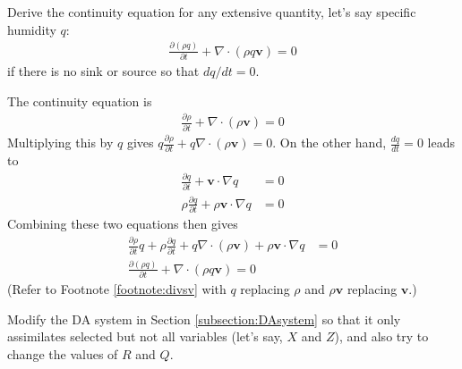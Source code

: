 \begin{Exercise}
Derive the continuity equation for any extensive quantity, let's say specific humidity $q$:
\begin{align*}
\frac{\partial (\rho q)}{\partial t} + \nabla \cdot(\rho q \textbf{v}) = 0
\end{align*}
if there is no sink or source so that $dq/dt=0$.
\end{Exercise}
\begin{Answer}
The continuity equation is
\begin{align*}
\frac{\partial \rho}{\partial t} + \nabla \cdot(\rho\textbf{v}) = 0 
\end{align*}
Multiplying this by $q$ gives $q\frac{\partial \rho}{\partial t} + q\nabla \cdot(\rho\textbf{v}) = 0$. On the other hand, $\frac{dq}{dt} = 0$ leads to
\begin{align*}
\frac{\partial q}{\partial t} + \textbf{v}\cdot \nabla{q} &= 0 \\
\rho\frac{\partial q}{\partial t} + \rho\textbf{v}\cdot \nabla{q} &= 0
\end{align*}
Combining these two equations then gives
\begin{align*}
\frac{\partial \rho}{\partial t}q + \rho\frac{\partial q}{\partial t} + q\nabla \cdot(\rho\textbf{v}) + \rho\textbf{v}\cdot \nabla{q} &= 0 \\
\frac{\partial (\rho q)}{\partial t} + \nabla \cdot(\rho q \textbf{v}) = 0
\end{align*}
(Refer to Footnote \ref{footnote:divsv} with $q$ replacing $\rho$ and $\rho \textbf{v}$ replacing $\textbf{v}$.)
\end{Answer}

\begin{Exercise}
Modify the DA system in Section \ref{subsection:DAsystem} so that it only assimilates selected but not all variables (let's say, $X$ and $Z$), and also try to change the values of $R$ and $Q$.
\end{Exercise}